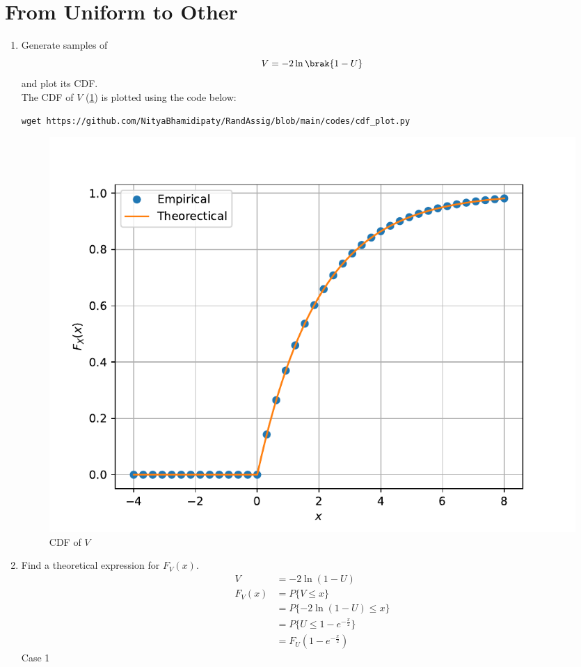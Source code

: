 \documentclass[journal,12pt,twocolumn]{IEEEtran}
\renewcommand\thesection{\arabic{section}}
\begin{document}
\section{From Uniform to Other}
\begin{enumerate}[label=\thesection.\arabic*
,ref=\thesection.\theenumi]
%
\item
Generate samples of 
%
\begin{equation}
V = -2\ln\brak{1-U}
\end{equation}
%
and plot its CDF.  \\
\solution
The CDF of $V$ (\ref{fig:other_cdf}) is plotted using the code below:
\begin{lstlisting}
wget https://github.com/NityaBhamidipaty/RandAssig/blob/main/codes/cdf_plot.py
\end{lstlisting}
\begin{figure}
    \centering
    \includegraphics[width=\columnwidth]{./figs/other_cdf.pdf}
    \caption{CDF of $V$}
    \label{fig:other_cdf}
\end{figure}
\item Find a theoretical expression for $F_V(x)$.\\
\solution
\begin{align}
    V &= -2\ln(1-U)\\
    F_V(x) &= P\{V\le x\}\\
    &= P\{-2\ln(1-U)\le x\}\\
    &= P\{U\le1-e^{-\frac{x}{2}}\}\\
    &= F_U(1-e^{-\frac{x}{2}})
\end{align}
Case 1
\begin{align}

\end{align}
\end{enumerate}
\end{document}
